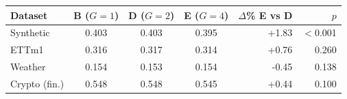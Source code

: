 \begin{tabular}{lcccrr}
\toprule
Dataset & B ($G{=}1$) & D ($G{=}2$) & E ($G{=}4$) & $\Delta$\% E vs D & $p$ \\
\midrule
Synthetic & 0.403 & 0.403 & 0.395 & +1.83 & $<$0.001 \\
ETTm1 & 0.316 & 0.317 & 0.314 & +0.76 & 0.260 \\
Weather & 0.154 & 0.153 & 0.154 & -0.45 & 0.138 \\
Crypto (fin.) & 0.548 & 0.548 & 0.545 & +0.44 & 0.100 \\
\bottomrule
\end{tabular}
